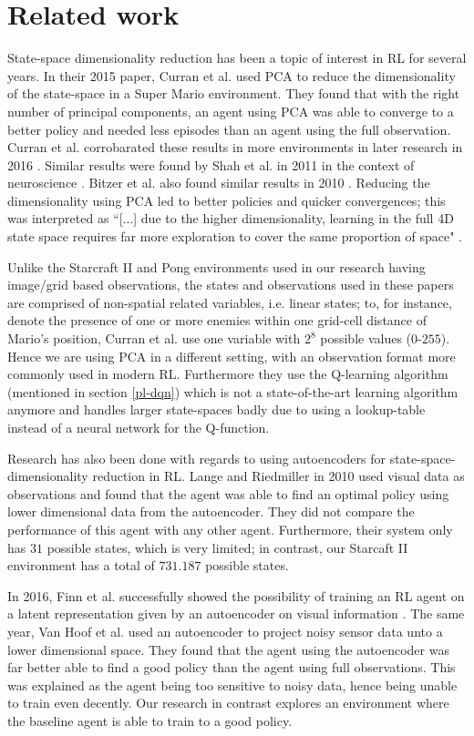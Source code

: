 \chapter{Related work}\label{relatedwork}
State-space dimensionality reduction has been a topic of interest in RL for several years. In their 2015 paper, Curran et al. \cite{mario} used PCA to reduce the dimensionality of the state-space in a Super Mario environment. They found that with the right number of principal components, an agent using PCA was able to converge to a better policy and needed less episodes than an agent using the full observation. Curran et al. corrobarated these results in more environments in later research in 2016 \cite{pca_curran}. Similar results were found by Shah et al. in 2011 in the context of neuroscience \cite{pca_neural}. Bitzer et al. also found similar results in 2010 \cite{pca_bitzer}. Reducing the dimensionality using PCA led to better policies and quicker convergences; this was interpreted as ``[...] due to the higher dimensionality, learning in the full 4D state space requires far more exploration to cover the same proportion of space" \cite{pca_bitzer}.

Unlike the Starcraft II and Pong environments used in our research having image/grid based observations, the states and observations used in these papers are comprised of non-spatial related variables, i.e. linear states; to, for instance, denote the presence of one or more enemies within one grid-cell distance of Mario's position, Curran et al. use one variable with $2^8$ possible values ($0$-$255$). Hence we are using PCA in a different setting, with an observation format more commonly used in modern RL. Furthermore they use the Q-learning algorithm (mentioned in section \ref{pl-dqn}) which is not a state-of-the-art learning algorithm anymore and handles larger state-spaces badly due to using a lookup-table instead of a neural network for the Q-function.

Research has also been done with regards to using autoencoders for state-space-dimensionality reduction in RL. Lange and Riedmiller in 2010 \cite{AE_2010} used visual data as observations and found that the agent was able to find an optimal policy using lower dimensional data from the autoencoder. They did not compare the performance of this agent with any other agent. Furthermore, their system only has $31$ possible states, which is very limited; in contrast, our Starcaft II environment has a total of $731.187$ possible states. 

In 2016, Finn et al. successfully showed the possibility of training an RL agent on a latent representation given by an autoencoder on visual information \cite{ae_visual}. The same year, Van Hoof et al. \cite{AE_2016} used an autoencoder to project noisy sensor data unto a lower dimensional space. They found that the agent using the autoencoder was far better able to find a good policy than the agent using full observations. This was explained as the agent being too sensitive to noisy data, hence being unable to train even decently. Our research in contrast explores an environment where the baseline agent is able to train to a good policy.

